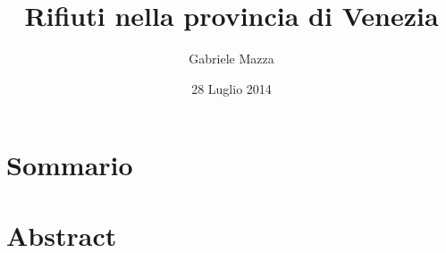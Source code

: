 \documentclass[a4paper,11pt,twoside,openright]{book}							%
\date{28 Luglio 2014}
\author{Gabriele Mazza}
\title{Rifiuti nella provincia di Venezia}
\begin{document}






\chapter*{Sommario}
\label{Cap:sommario}


\chapter*{Abstract}
\label{Cap:abstract}
\end{document}
